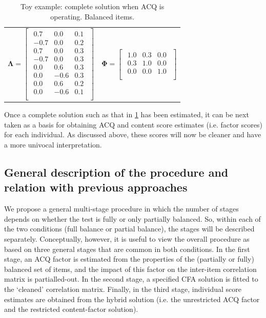 \begin{table}[H]
  \caption{Toy example: complete solution when ACQ is operating. Balanced items.}
  \label{tab2}
  \centering
  \begin{tabular}{c c}
    $\boldsymbol{\Lambda} =
    \begin{bmatrix}
      \begin{array}{rrr}
        0.7  &  0.0 &  0.1 \\
        -0.7 &  0.0 &  0.2 \\
        0.7  &  0.0 &  0.3 \\
        -0.7 &  0.0 &  0.3 \\
        0.0  &  0.6 &  0.3 \\
        0.0  & -0.6 &  0.3 \\
        0.0  &  0.6 &  0.2 \\
        0.0  & -0.6 &  0.1 \\
      \end{array}
    \end{bmatrix}$
    &
    $\boldsymbol{\Phi} =
    \begin{bmatrix}
      \begin{array}{rrr}
        1.0 &  0.3 &  0.0 \\
        0.3 &  1.0 &  0.0 \\
        0.0 &  0.0 &  1.0 \\
      \end{array}
    \end{bmatrix}$
  \end{tabular}
\end{table}

Once a complete solution such as that in \cref{tab2} has been estimated, it can be next taken as a basis for obtaining ACQ and content score estimates (i.e. factor scores) for each individual. As discussed above, these scores will now be cleaner and have a more univocal interpretation.

\subsection{General description of the procedure and relation with previous approaches}

We propose a general multi-stage procedure in which the number of stages depends on whether the test is fully or only partially balanced. So, within each of the two conditions (full balance or partial balance), the stages will be described separately. Conceptually, however, it is useful to view the overall procedure as based on three general stages that are common in both conditions. In the first stage, an ACQ factor is estimated from the properties of the (partially or fully) balanced set of items, and the impact of this factor on the inter-item correlation matrix is partialled-out. In the second stage, a specified CFA solution is fitted to the ‘cleaned’ correlation matrix. Finally, in the third stage, individual score estimates are obtained from the hybrid solution (i.e. the unrestricted ACQ factor and the restricted content-factor solution).

